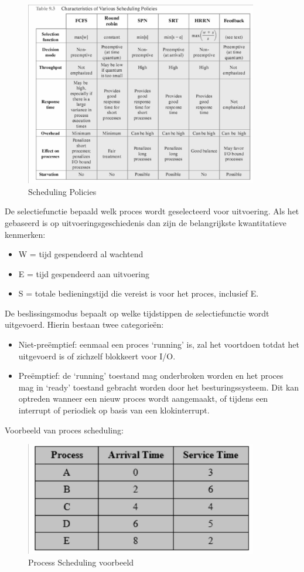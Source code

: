 \begin{figure}[htp]
    \centering
            \includegraphics[width=4in]{img/schedulingpolicies.png}
        \caption{Scheduling Policies}
    \label{fig:Scheduling Policies}
\end{figure}

De selectiefunctie bepaald welk proces wordt geselecteerd voor uitvoering. Als het gebaseerd is op uitvoeringsgeschiedenis dan zijn de belangrijkste kwantitatieve kenmerken:
\begin{itemize}
\item W = tijd gespendeerd al wachtend
\item E = tijd gespendeerd aan uitvoering
\item S = totale bedieningstijd die vereist is voor het proces, inclusief E.
\end{itemize}

De beslissingsmodus bepaalt op welke tijdstippen de selectiefunctie wordt uitgevoerd. Hierin bestaan twee categorieën:
\begin{itemize}
\item Niet-preëmptief: eenmaal een proces ‘running’ is, zal het voortdoen totdat het uitgevoerd is of zichzelf blokkeert voor I/O.
\item Preëmptief: de ‘running’ toestand mag onderbroken worden en het proces mag in ‘ready’ toestand gebracht worden door het besturingssysteem. Dit kan optreden wanneer een nieuw proces wordt aangemaakt, of tijdens een interrupt of periodiek op basis van een klokinterrupt.
\end{itemize}

Voorbeeld van proces scheduling:

\begin{figure}[htp]
    \centering
            \includegraphics[width=4in]{img/processcheduling.png}
        \caption{Process Scheduling voorbeeld}
    \label{fig:Process Scheduling voorbeeld}
\end{figure}

